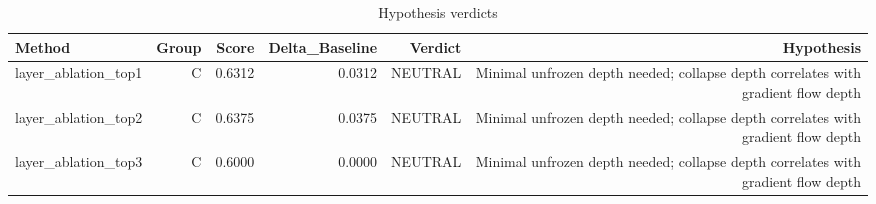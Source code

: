 \begin{table}[htbp]
\centering
\caption{Hypothesis verdicts}
\label{tab:hyp-verdicts}
\begin{tabular}{lrrrrr}
\toprule
\textbf{Method} & \textbf{Group} & \textbf{Score} & \textbf{Delta\_Baseline} & \textbf{Verdict} & \textbf{Hypothesis} \\
\midrule
layer\_ablation\_top1 & C & 0.6312 & 0.0312 & NEUTRAL & Minimal unfrozen depth needed; collapse depth correlates with gradient flow depth \\
layer\_ablation\_top2 & C & 0.6375 & 0.0375 & NEUTRAL & Minimal unfrozen depth needed; collapse depth correlates with gradient flow depth \\
layer\_ablation\_top3 & C & 0.6000 & 0.0000 & NEUTRAL & Minimal unfrozen depth needed; collapse depth correlates with gradient flow depth \\
\bottomrule
\end{tabular}
\end{table}